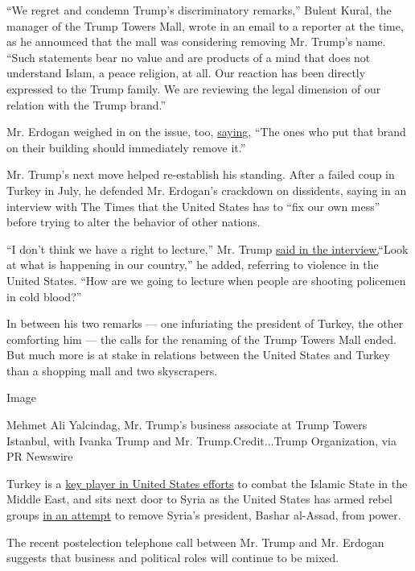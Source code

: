 ``We regret and condemn Trump's discriminatory remarks,'' Bulent Kural,
the manager of the Trump Towers Mall, wrote in an email to a reporter at
the time, as he announced that the mall was considering removing Mr.
Trump's name. ``Such statements bear no value and are products of a mind
that does not understand Islam, a peace religion, at all. Our reaction
has been directly expressed to the Trump family. We are reviewing the
legal dimension of our relation with the Trump brand.''

Mr. Erdogan weighed in on the issue, too,
\href{http://www.yenisafak.com/gundem/erdogandan-trump-towers-cagrisi-2486503}{saying,}
``The ones who put that brand on their building should immediately
remove it.''

Mr. Trump's next move helped re-establish his standing. After a failed
coup in Turkey in July, he defended Mr. Erdogan's crackdown on
dissidents, saying in an interview with The Times that the United States
has to ``fix our own mess'' before trying to alter the behavior of other
nations.

``I don't think we have a right to lecture,'' Mr. Trump
\href{http://www.nytimes.com/2016/07/22/us/politics/donald-trump-foreign-policy-interview.html}{said
in the interview.}``Look at what is happening in our country,'' he
added, referring to violence in the United States. ``How are we going to
lecture when people are shooting policemen in cold blood?''

In between his two remarks --- one infuriating the president of Turkey,
the other comforting him --- the calls for the renaming of the Trump
Towers Mall ended. But much more is at stake in relations between the
United States and Turkey than a shopping mall and two skyscrapers.

Image

Mehmet Ali Yalcindag, Mr. Trump's business associate at Trump Towers
Istanbul, with Ivanka Trump and Mr. Trump.Credit...Trump Organization,
via PR Newswire

Turkey is a
\href{http://www.nytimes.com/2014/10/03/world/europe/turkey-votes-to-allow-operations-against-isis.html}{key
player in United States efforts} to combat the Islamic State in the
Middle East, and sits next door to Syria as the United States has armed
rebel groups
\href{http://www.nytimes.com/2016/09/18/world/middleeast/his-position-still-secure-bashar-al-assad-smiles-as-syria-burns.html}{in
an attempt} to remove Syria's president, Bashar al-Assad, from power.

The recent postelection telephone call between Mr. Trump and Mr. Erdogan
suggests that business and political roles will continue to be mixed.

